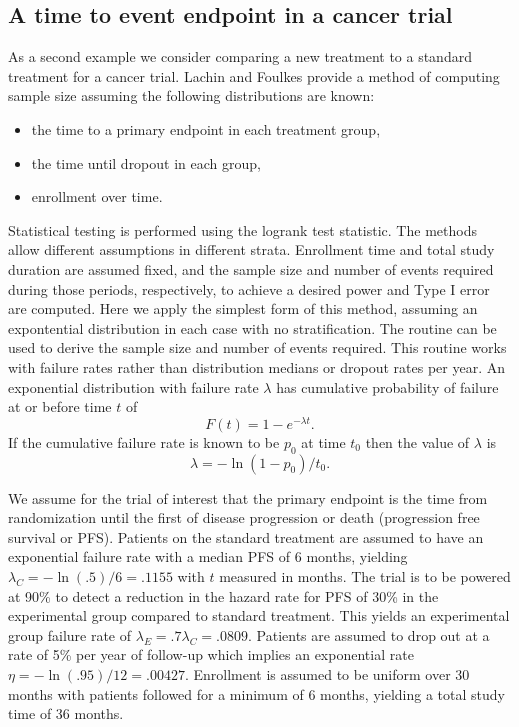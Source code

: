 \subsection{A time to event endpoint in a cancer trial \label{sec:CAex}}
As a second example we consider comparing a new treatment to a standard treatment for a cancer trial.  Lachin and Foulkes \cite{LachinFoulkes} provide a method of computing sample size assuming the following distributions are known:
\begin{itemize} 
\item the time to a primary endpoint in each treatment group,
\item the time until dropout in each group,
\item enrollment over time.
\end{itemize}
Statistical testing is performed using the logrank test statistic.
The methods allow different assumptions in different strata.
Enrollment time and total study duration are assumed fixed, and the sample size and number of events required during those periods, respectively, to achieve a desired power and Type I error are computed.
Here we apply the simplest form of this method, assuming an expontential distribution in each case with no stratification. 
The routine  can be used to derive the sample size and number of events required.
This routine works with failure rates rather than distribution medians or dropout rates per year.
An exponential distribution with failure rate $\lambda$ has cumulative probability of failure at or before time $t$ of
\begin{equation}
F(t)=1-e^{-\lambda t}.
\end{equation}
If the cumulative failure rate is known to be $p_0$ at time $t_0$ then the value of $\lambda$ is
\begin{equation}
\lambda= -\ln(1-p_0) / t_0.
\end{equation}

We assume for the trial of interest that the primary endpoint is the time from randomization until the first of disease progression or death (progression free survival or PFS). Patients on the standard treatment are assumed to have an exponential failure rate with a median PFS of 6 months, yielding $\lambda_C= -\ln(.5)/6=.1155$ with $t$ measured in months. The trial is to be powered at 90\% to detect a reduction in the hazard rate for PFS of 30\% in the experimental group compared to standard treatment. This yields an experimental group failure rate of $\lambda_E=.7\lambda_C=.0809$. Patients are assumed to drop out at a rate of 5\% per year of follow-up which implies an exponential rate $\eta=-\ln(.95)/12=.00427$. 
Enrollment is assumed to be uniform over 30 months with patients followed for a minimum of 6 months, yielding a total study time of 36 months. 

